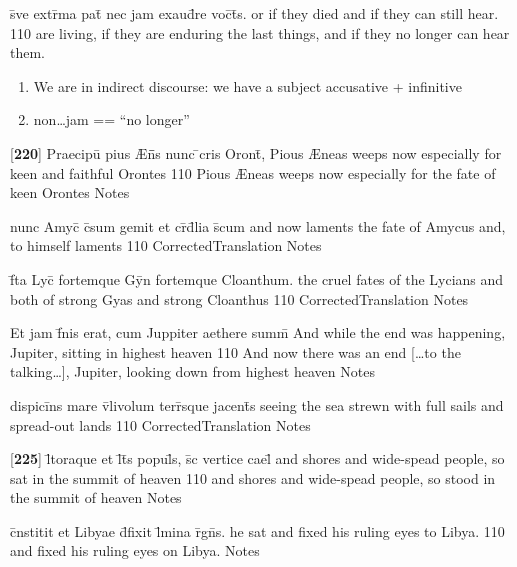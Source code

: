 \latline
  {s\={\macron {\i}}ve extr\={}ma pat\={\macron {\i}} nec jam exaud\={\macron {\i}}re voc\={}t\={}s.}
  { or if they died and if they can still hear. }
  {110}
  { are living, if they are enduring the last things, and if they no longer can hear them. }
  { \begin{enumerate}
  	\item We are in indirect discourse:  we have a subject accusative + infinitive
  	\item non{\ldots}jam == ``no longer''
  \end{enumerate} }

\latline
  {[\textbf{220}] Praecipu\={} pius {\AE}n\={}\={}s nunc \={}cris Oront\={\macron {\i}},}
  { Pious {\AE}neas weeps now especially for keen and faithful Orontes }
  {110}
  { Pious {\AE}neas weeps now especially for the fate of keen Orontes }
  { Notes }


\latline
  {nunc Amyc\={\macron {\i}} c\={}sum gemit et cr\={}d\={}lia s\={}cum}
  { and now laments the fate of Amycus and, to himself laments }
  {110}
  { CorrectedTranslation }
  { Notes }


\latline
  {f\={}ta Lyc\={\macron {\i}} fortemque Gy\={}n fortemque Cloanthum.}
  { the cruel fates of the Lycians and both of strong Gyas and strong Cloanthus }
  {110}
  { CorrectedTranslation }
  { Notes }


\latline
  {Et jam f\={\macron {\i}}nis erat, cum Juppiter aethere summ\={}}
  { And while the end was happening, Jupiter, sitting in highest heaven }
  {110}
  { And now there was an end [{\ldots}to the talking\ldots], Jupiter, looking down from highest heaven }
  { Notes }


\latline
  {dispici\={}ns mare v\={}livolum terr\={}sque jacent\={\macron {\i}}s}
  { seeing the sea strewn with full sails and spread-out lands }
  {110}
  { CorrectedTranslation }
  { Notes }


\latline
  {[\textbf{225}] l\={\macron {\i}}toraque et l\={}t\={}s popul\={}s, s\={\macron {\i}}c vertice cael\={\macron {\i}}}
  { and shores and wide-spead people, so sat in the summit of heaven }
  {110}
  { and shores and wide-spead people, so stood in the summit of heaven }
  { Notes }


\latline
  {c\={}nstitit et Libyae d\={}fixit l\={}mina r\={}gn\={\macron {\i}}s.}
  { he sat and fixed his ruling eyes to Libya. }
  {110}
  { and fixed his ruling eyes on Libya. }
  { Notes }


